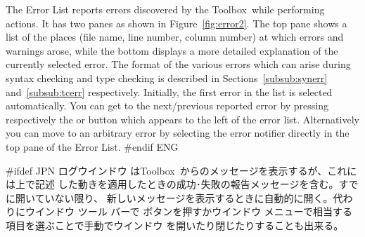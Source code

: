 \documentclass[\pformat,12pt]{article}
\newcommand{\Toolbox}{Toolbox}
\newcommand{\Toolbox}{Toolbox}
\newcommand{\guicmd}[1]{{\sf #1}}
\newcommand{\guicmd}[1]{{\gt #1}}
\begin{document}

The \guicmd{Error List} reports errors discovered by the \Toolbox\
while performing actions. It has two panes as shown in
Figure~\ref{fig:error2}. The top pane shows a list of the places (file
name, line number, column number) at which errors and warnings arose,
while the bottom displays a more detailed explanation of the currently
selected error. The format of the various errors which can arise
  during syntax checking and type checking is described in
  Sections~\ref{subsub:synerr} and~\ref{subsub:tcerr} respectively.  
Initially, the first error in the list is selected
automatically. You can get to the next/previous reported error by
pressing respectively the {\fbox{\tt >}} or \fbox{{\tt <}} button
which appears to the left of the error list. Alternatively you can
move to an arbitrary error by selecting the error notifier directly in
the top pane of the \guicmd{Error List}.
#endif ENG

#ifdef JPN
\guicmd{ログウインドウ} は\Toolbox\ からのメッセージを表示するが、これには上で記述
した動きを適用したときの成功･失敗の報告メッセージを含む。すでに開いていない限り、
新しいメッセージを表示するときに自動的に開く。代わりに\guicmd{ウインドウ} ツール
バーで 
ボタンを押すか\guicmd{ウインドウ} メニューで相当する項目を選ぶことで手動でウインドウ
を開いたり閉じたりすることも出来る。

\end{document}
